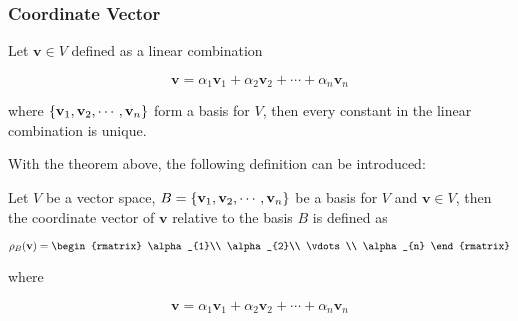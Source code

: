 \documentclass[a4paper,12pt]{article}
\begin{document}
\subsubsection{Coordinate Vector}
\begin{thm}
  Let $\mathbf{v}\in V$ defined as a linear combination

  $$\mathbf{v}=\alpha_{1}\mathbf{v}_{1}+\alpha_{2}\mathbf{v}_{2}+\cdots+\alpha_{n}\mathbf{v}_{n}$$\s

  where $\left\{ \mathbf{v}_{1},\mathbf{v}_{2},\cdots,\mathbf{v}_{n}\right\}$ form a basis for $V$, then every constant in the linear combination is unique.
\end{thm}\n

With the theorem above, the following definition can be introduced:\n

\begin{dft}
  Let $V$ be a vector space, $B=\left\{ \mathbf{v}_{1},\mathbf{v}_{2},\cdots,\mathbf{v}_{n}\right\}$ be a basis for $V$ and $\mathbf{v}\in V$, then the coordinate vector of $\mathbf{v}$ relative to the basis $B$ is defined as

  $$\rho_{B}(\mathbf{v})=\begin{rmatrix}
    \alpha_{1}\\
    \alpha_{2}\\
    \vdots\\
    \alpha_{n}
  \end{rmatrix}$$\s

  where
  
  $$\mathbf{v}=\alpha_{1}\mathbf{v}_{1}+\alpha_{2}\mathbf{v}_{2}+\cdots+\alpha_{n}\mathbf{v}_{n}$$\s
\end{dft}\n
\end{document}
